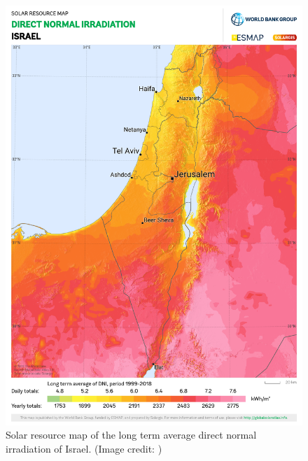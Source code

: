 \begin{figure}[h!]
	\centering
  	\includegraphics[width = \textwidth]{solar_maps/israel/israel_dni}
	\caption{Solar resource map of the long term average direct normal irradiation of Israel. (Image credit: \cite{GlobalSolarAtlas:2020, Solargis:2021})}
	\label{fig:dni_israel}
\end{figure}










